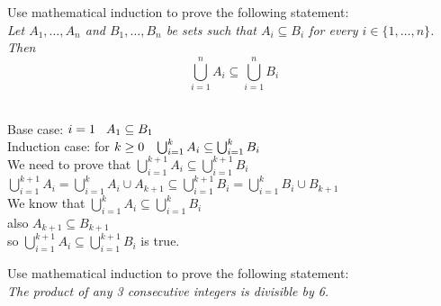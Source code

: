 \documentclass[addpoints,10pt,answers]{exam}
\begin{document}
\begin{questions}
\begin{solution}
  
  
 
\end{solution}


\question[12] Use mathematical induction to prove the following statement:\\

\emph{
Let $A_1, \ldots, A_n$ and $B_1, \ldots, B_n$ be sets such that $A_i \subseteq B_i$ for every $i \in \{1, \ldots, n\}$.
Then 
$$
\bigcup_{i = 1}^{n} A_i \subseteq \bigcup_{i = 1}^{n} B_i
$$
}
 

\begin{solution}
\\Base case: $i=1 \hspace{3mm} A_1 \subseteq B_1$\\
Induction case: for $k \geq 0 \hspace{3mm}
\bigcup_{i = 1}^{k} A_i \subseteq \bigcup_{i = 1}^{k} B_i$\\
We need to prove that $\bigcup_{i = 1}^{k+1} A_i \subseteq \bigcup_{i = 1}^{k+1} B_i$\\
$\bigcup_{i = 1}^{k+1} A_i=\bigcup_{i = 1}^{k} A_i \cup A_{k+1}\subseteq \bigcup_{i = 1}^{k+1} B_i=\bigcup_{i = 1}^{k} B_i\cup B_{k+1}$\\
We know that $\bigcup_{i = 1}^{k} A_i \subseteq \bigcup_{i = 1}^{k} B_i$\\
also $A_{k+1}\subseteq B_{k+1}$\\
so $\bigcup_{i = 1}^{k+1} A_i \subseteq \bigcup_{i = 1}^{k+1} B_i$ is true.
\end{solution}


\question[12] Use mathematical induction to prove the following statement:\\

\emph{
The product of any 3 consecutive integers is divisible by 6. 
}
 


\end{questions}
\end{document}
